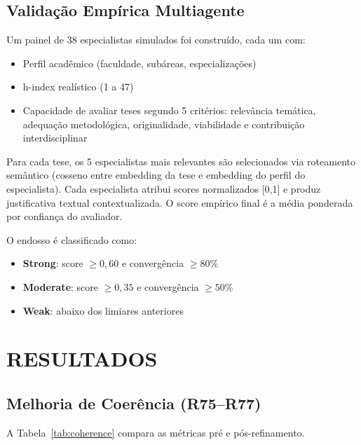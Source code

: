 \documentclass[a4paper,12pt]{article}
\begin{document}
\subsection{Validação Empírica Multiagente}

Um painel de 38 especialistas simulados foi construído, cada um com:
\begin{itemize}
    \item Perfil acadêmico (faculdade, subáreas, especializações)
    \item h-index realístico (1 a 47)
    \item Capacidade de avaliar teses segundo 5 critérios: relevância temática, 
          adequação metodológica, originalidade, viabilidade e contribuição interdisciplinar
\end{itemize}

Para cada tese, os 5 especialistas mais relevantes são selecionados via roteamento 
semântico (cosseno entre embedding da tese e embedding do perfil do especialista). 
Cada especialista atribui scores normalizados [0,1] e produz justificativa textual 
contextualizada. O score empírico final é a média ponderada por confiança do avaliador.

O endosso é classificado como:
\begin{itemize}
    \item \textbf{Strong}: score $\geq 0{,}60$ e convergência $\geq 80\%$
    \item \textbf{Moderate}: score $\geq 0{,}35$ e convergência $\geq 50\%$
    \item \textbf{Weak}: abaixo dos limiares anteriores
\end{itemize}


\section{RESULTADOS}\label{sec:resultados}

\subsection{Melhoria de Coerência (R75--R77)}

A Tabela~\ref{tab:coherence} compara as métricas pré e pós-refinamento.
\end{document}
